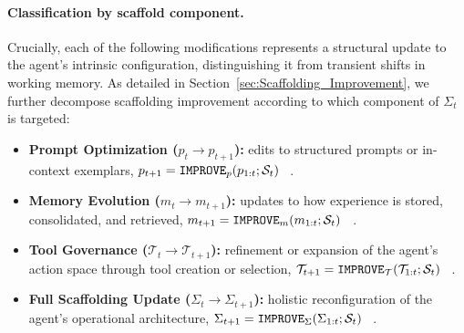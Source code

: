 \paragraph{Classification by scaffold component.}
Crucially, each of the following modifications represents a structural update to the agent's intrinsic configuration, distinguishing it from transient shifts in working memory. As detailed in Section~\ref{sec:Scaffolding_Improvement}, we further decompose scaffolding improvement according to which component of $\Sigma_t$ is targeted:
\begin{itemize}
    \item \textbf{Prompt Optimization ($p_t \rightarrow p_{t+1}$):}
     edits to structured prompts or in-context exemplars,
    $p_{t+1}=\operatorname{\mathtt{IMPROVE}}_{p}(p_{1:t}; \mathcal{S}_t)$
    ~\citep{yuksekgonul2024textgradautomaticdifferentiationtext, guo2025evopromptconnectingllmsevolutionary, fernando2024promptbreeder, zhou2022large}.

    \item \textbf{Memory Evolution ($m_t \rightarrow m_{t+1}$):}
     updates to how experience is stored, consolidated, and retrieved,
    $m_{t+1}=\operatorname{\mathtt{IMPROVE}}_{m}(m_{1:t}; \mathcal{S}_t)$
    ~\citep{chhikara2025mem0buildingproductionreadyai, wang2024agentworkflowmemory, zhang2025memgenweavinggenerativelatent, zhong2024memorybank}.

    \item \textbf{Tool Governance ($\mathcal{T}_t \rightarrow \mathcal{T}_{t+1}$):}
     refinement or expansion of the agent’s action space through tool creation or selection,
    $\mathcal{T}_{t+1}=\operatorname{\mathtt{IMPROVE}}_{\mathcal{T}}(\mathcal{T}_{1:t}; \mathcal{S}_t)$
    ~\citep{haque2025advancedtoollearningselection, wang2025toolgenunifiedtoolretrieval, dong2025tool, zhang2025agentorchestraorchestratinghierarchicalmultiagent}.

    \item \textbf{Full Scaffolding Update ($\Sigma_t \rightarrow \Sigma_{t+1}$):}
    holistic reconfiguration of the agent’s operational architecture,
    $\Sigma_{t+1}=\operatorname{\mathtt{IMPROVE}}_{\Sigma}(\Sigma_{1:t}; \mathcal{S}_t)$
    ~\citep{hu2025automateddesignagenticsystems, zhang2025darwingodelmachineopenended, novikov2025alphaevolvecodingagentscientific, xia2025livesweagentsoftwareengineeringagents}.
\end{itemize}
